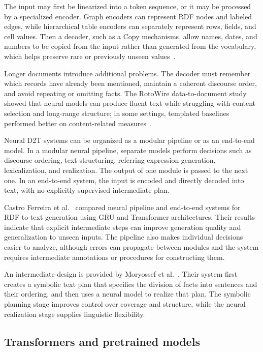 The input may first be linearized into a token sequence, or it may be processed
by a specialized encoder. Graph encoders can represent RDF nodes and labeled
edges, while hierarchical table encoders can separately represent rows, fields,
and cell values. Then a decoder, such as a Copy mechanisms, allow names, dates, and numbers to be copied
from the input rather than generated from the vocabulary, which helps preserve
rare or previously unseen values~\cite{gatt2018survey,osuji2024systematic}.

Longer documents introduce additional problems. The decoder must remember which
records have already been mentioned, maintain a coherent discourse order, and
avoid repeating or omitting facts. The RotoWire data-to-document study showed
that neural models can produce fluent text while struggling with content
selection and long-range structure; in some settings, templated baselines
performed better on content-related measures~\cite{wiseman-etal-2017-challenges}.

Neural D2T systems can be organized as a modular pipeline or as an end-to-end
model. In a modular neural pipeline, separate models perform decisions such as
discourse ordering, text structuring, referring expression generation,
lexicalization, and realization. The output of one module is passed to the next
one. In an end-to-end system, the input is encoded and directly decoded into
text, with no explicitly supervised intermediate plan.

Castro Ferreira et al.~\cite{castro-ferreira-etal-2019-neural} compared neural
pipeline and end-to-end systems for RDF-to-text generation using GRU and
Transformer architectures. Their results indicate that explicit intermediate
steps can improve generation quality and generalization to unseen inputs. The
pipeline also makes individual decisions easier to analyze, although errors can
propagate between modules and the system requires intermediate annotations or
procedures for constructing them.

An intermediate design is provided by Moryossef et al.~\cite{moryossef-etal-2019-step}.
Their system first creates a symbolic text plan that specifies the division of
facts into sentences and their ordering, and then uses a neural model to
realize that plan. The symbolic planning stage improves control over coverage
and structure, while the neural realization stage supplies linguistic
flexibility.

\subsection{Transformers and pretrained models}

